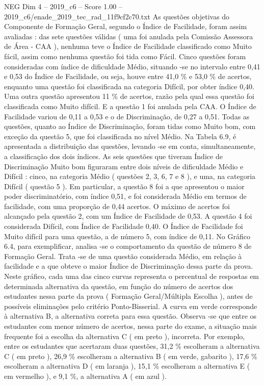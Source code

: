 \begin{textsample}{NEG Dim 4 – 2019\_c6 – Score 1.00 – 2019\_c6/enade\_2019\_tec\_rad\_11f9cf2c70.txt}
As questões objetivas do Componente de Formação Geral, segundo o Índice de Facilidade, foram assim avaliadas : das sete questões válidas ( uma foi anulada pela Comissão Assessora de Área - CAA ), nenhuma teve o Índice de Facilidade classificado como Muito fácil, assim como nenhuma questão foi tida como Fácil.
Cinco questões foram consideradas com índice de dificuldade Médio, situando -se no intervalo entre 0,41 e 0,53 do Índice de Facilidade, ou seja, houve entre 41,0 \% e 53,0 \% de acertos, enquanto uma questão foi classificada na categoria Difícil, por obter índice 0,40.
Uma outra questão apresentou 11 \% de acertos, razão pela qual essa questão foi classificada como Muito difícil.
E a questão 1 foi anulada pela CAA.
O Índice de Facilidade variou de 0,11 a 0,53 e o de Discriminação, de 0,27 a 0,51.
Todas as questões, quanto ao Índice de Discriminação, foram tidas como Muito bom, com exceção da questão 5, que foi classificada no nível Médio.
Na Tabela 6.9, é apresentada a distribuição das questões, levando -se em conta, simultaneamente, a classificação dos dois índices.
As seis questões que tiveram Índice de Discriminação Muito bom figuraram entre dois níveis de dificuldade Médio e Difícil : cinco, na categoria Médio ( questões 2, 3, 6, 7 e 8 ), e uma, na categoria Difícil ( questão 5 ).
Em particular, a questão 8 foi a que apresentou o maior poder discriminatório, com índice 0,51, e foi considerada Médio em termos de facilidade, com uma proporção de 0,44 acertos.
O máximo de acertos foi alcançado pela questão 2, com um Índice de Facilidade de 0,53.
A questão 4 foi considerada Difícil, com Índice de Facilidade 0,40.
O Índice de Facilidade foi Muito difícil para uma questão, a de número 5, com índice de 0,11.
No Gráfico 6.4, para exemplificar, analisa -se o comportamento da questão de número 8 de Formação Geral.
Trata -se de uma questão considerada Médio, em relação à facilidade e a que obteve o maior Índice de Discriminação dessa parte da prova.
Neste gráfico, cada uma das cinco curvas representa o percentual de respostas em determinada alternativa da questão, em função do número de acertos dos estudantes nessa parte da prova ( Formação Geral/Múltipla Escolha ), antes de possíveis eliminações pelo critério Ponto-Bisserial.
A curva em verde corresponde à alternativa B, a alternativa correta para essa questão.
Observa -se que entre os estudantes com menor número de acertos, nessa parte do exame, a situação mais frequente foi a escolha da alternativa C ( em preto ), incorreta.
Por exemplo, entre os estudantes que acertaram duas questões, 31,2 \% escolheram a alternativa C ( em preto ), 26,9 \% escolheram a alternativa B ( em verde, gabarito ), 17,6 \% escolheram a alternativa D ( em laranja ), 15,1 \% escolheram a alternativa E ( em vermelho ), e 9,1 \%, a alternativa A ( em azul ).

\end{textsample}
